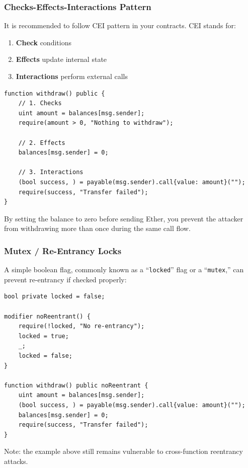 \documentclass[12pt]{article}
\newcommand{\codeinline}[1]{\texttt{#1}}
\begin{document}
\subsubsection*{Checks-Effects-Interactions Pattern}

It is recommended to follow CEI pattern in your contracts. CEI stands for:

\begin{enumerate}
    \item \textbf{Check} conditions
    \item \textbf{Effects} update internal state
    \item \textbf{Interactions} perform external calls
\end{enumerate}

\begin{lstlisting}[language=Solidity]
function withdraw() public {
    // 1. Checks
    uint amount = balances[msg.sender];
    require(amount > 0, "Nothing to withdraw");

    // 2. Effects
    balances[msg.sender] = 0;

    // 3. Interactions
    (bool success, ) = payable(msg.sender).call{value: amount}("");
    require(success, "Transfer failed");
}
\end{lstlisting}

\noindent
By setting the balance to zero before sending Ether, you prevent the attacker from withdrawing more than once during the same call flow.

\subsubsection*{Mutex / Re-Entrancy Locks}

A simple boolean flag, commonly known as a “\codeinline{locked}” flag or a “\codeinline{mutex},” can prevent re-entrancy if checked properly:

\begin{lstlisting}[language=Solidity]
bool private locked = false;

modifier noReentrant() {
    require(!locked, "No re-entrancy");
    locked = true;
    _;
    locked = false;
}

function withdraw() public noReentrant {
    uint amount = balances[msg.sender];
    (bool success, ) = payable(msg.sender).call{value: amount}("");
    balances[msg.sender] = 0;
    require(success, "Transfer failed");
}
\end{lstlisting}

\noindent
Note: the example above still remains vulnerable to cross-function reentrancy attacks.
\end{document}

